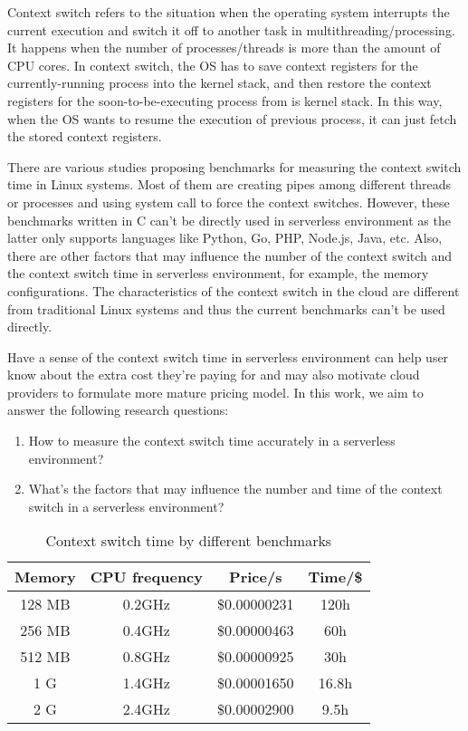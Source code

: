 Context switch\cite{cs-def} refers to the situation when the operating system interrupts the current execution and switch it off to another task in multithreading/processing.
It happens when the number of processes/threads is more than the amount of CPU cores.
In context switch, the OS has to save context registers for the currently-running process into the kernel stack,
and then restore the context registers for the soon-to-be-executing process from is kernel stack\cite{OS-Book}.
In this way, when the OS wants to resume the execution of previous process, it can just fetch the stored context registers.

There are various studies\cite{cs-arm,cs-datasize,cs-lmbench,cs-pipes} proposing benchmarks for measuring the context switch time in Linux systems.
Most of them are creating pipes among different threads or processes and using system call to force the context switches. 
However, these benchmarks written in C can't be directly used in serverless environment as the latter only supports languages like Python, Go, PHP, Node.js, Java, etc.
Also, there are other factors that may influence the number of the context switch and the context switch time in serverless environment,
for example, the memory configurations.
The characteristics of the context switch in the cloud are different from traditional Linux systems and thus the current benchmarks can't be used directly.

Have a sense of the context switch time in serverless environment can help user know about the extra cost they're paying for and 
may also motivate cloud providers to formulate more mature pricing model. 
In this work, we aim to answer the following research questions:
\begin{enumerate}
	\item How to measure the context switch time accurately in a serverless environment?
	\item What's the factors that may influence the number and time of the context switch in a serverless environment?
	
\end{enumerate}

\begin{center}
    \begin{table}
    \begin{tabular}{||c c c c||} 
     \hline
     Memory & CPU frequency & Price/s & Time/\$ \\ 
     \hline
     128 MB & 0.2GHz & \$0.00000231 & 120h\\ 
	 256 MB & 0.4GHz & \$0.00000463 & 60h\\ 
	 512 MB & 0.8GHz & \$0.00000925 & 30h\\ 
	 1 G & 1.4GHz & \$0.00001650 & 16.8h\\ 
	 2 G & 2.4GHz & \$0.00002900 & 9.5h\\ 
     \hline
    \end{tabular}
    \caption{\label{tab:price}Context switch time by different benchmarks}
\end{table}
\end{center}